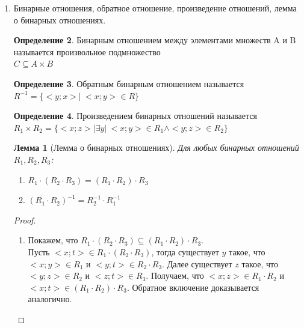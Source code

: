 \documentclass[a4paper]{article}
\newtheorem*{lemma*}{Лемма}
\theoremstyle{definition}
\newtheorem*{definition*}{Определение}
\begin{document}
\begin{enumerate}
\begin{definition*}[Декартова степень]
        В случае, если \mbox{$A_1=A_2=...=A_n$}, тогда $A_1 \times A_2 \times ... \times A_n$ называют декартовой степенью и обозначают, как $A^n=A_1 \times A_2 \times ... \times A_n$
       \end{definition*}
       \newpage
 \item Бинарные отношения, обратное отношение, произведение отношений, лемма о бинарных отношениях.
       \begin{definition*}Бинарным отношением между элементами множеств A и B называется произвольное подмножество\\
        $C \subseteq{A \times B}$
       \end{definition*}
       \begin{definition*}Обратным бинарным отношением называется \\
        $R^{-1} = \{<y;x> |\ <x;y> \in{R}\}$
       \end{definition*}
       \begin{definition*}Произведением бинарных отношений называется \\
        $R_{1}\times R_{2} = \{<x;z>          |\exists y |\ <x;y> \in R_{1}   \land <y;z> \in R_{2}\}$
       \end{definition*}
       \begin{lemma*}[Лемма о бинарных отношениях]
        Для любых бинарных отношений $R_{1},R_{2},R_{3} $:
        \begin{enumerate}
         \item     $R_{1}\cdot (R_{2}\cdot R_{3}) = (R_{1}\cdot R_{2})\cdot R_{3} $\\
         \item $(R_{1}\cdot R_{2})^{-1} = R_{2}^{-1}\cdot R_{1}^{-1} $
        \end{enumerate}
       \end{lemma*}
       \begin{proof}
        \begin{enumerate}
         \item Покажем, что $R_{1}\cdot (R_{2}\cdot R_{3}) \subseteq (R_{1}\cdot R_{2})\cdot R_{3} $. \\
               Пусть $<x;t> \in R_{1}\cdot (R_{2}\cdot R_{3})$, тогда существует $y$ такое, что \\ $<x;y>\in R_{1}$ и $<y;t>\in R_{2}\cdot R_{3}$. Далее существует $z$ такое, что  $<y;z>\in R_{2}$ и  $<z;t>\in R_{3}$. Получаем, что $<x;z>\in R_{1}\cdot R_{2}$ и $<x;t>\in (R_{1}\cdot R_{2})\cdot R_{3}$.
               Обратное включение доказывается аналогично.

\end{enumerate}
\end{proof}
\end{enumerate}
\end{document}
